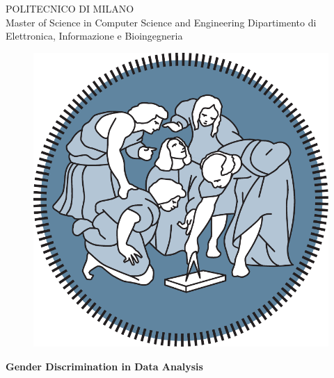 \thispagestyle{empty}
\vspace*{-1.5cm}

\bfseries{
\begin{center}

\large
POLITECNICO DI MILANO\\
\normalsize
Master of Science in Computer Science and Engineering
Dipartimento di Elettronica, Informazione e Bioingegneria

 
\vspace{5mm}


\begin{figure}[h]
\begin{center}
\includegraphics[scale=.275]{logo_polimi.pdf}
\end{center}
\end{figure}

\vspace{1cm}
\LARGE
\textbf{Gender Discrimination in Data Analysis}\\


\vspace{2cm}


\end{center}}
